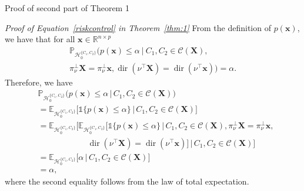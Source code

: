 \documentclass{beamer}
\newcommand{\projnu}{\pi_{\nu}^{\perp}}
\begin{document}
\begin{frame}[allowframebreaks=0.9]{Proof of second part of Theorem 1}

  \textit{Proof of Equation~\ref{riskcontrol} in Theorem~\ref{thm:1}}
    From the definition of $p(\mathbf{x})$, we have that for all $\mathbf{x} \in \mathbb{R}^{n \times p}$
    \begin{multline*}
      \mathbb{P}_{\mathcal{H}_0^{\{C_1,C_2\}}}\bigl(p(\mathbf{x}) \leq \alpha ~|~ C_1,C_2 \in \mathcal{C}(\mathbf{X}), \\
      \projnu \mathbf{X} = \projnu \mathbf{x}, \operatorname{dir}(\nu^\top \mathbf{X}) = \operatorname{dir}(\nu^\top \mathbf{x})\bigr) = \alpha.
    \end{multline*}
    Therefore, we have
    \begin{equation*}
      \begin{aligned}
        & \mathbb{P}_{\mathcal{H}_0^{\{C_1,C_2\}}}\big(p(\mathbf{x}) \le \alpha \,\big|\, C_1,C_2 \in \mathcal{C}(\mathbf{X})\big) \\
        &= \mathbb{E}_{\mathcal{H}_0^{\{C_1,C_2\}}}
            \Big[\mathds{1}\{p(\mathbf{x}) \le \alpha\} \,\big|\, C_1,C_2 \in \mathcal{C}(\mathbf{X})\Big] \\
        &= \mathbb{E}_{\mathcal{H}_0^{\{C_1,C_2\}}}
            \Big[\mathbb{E}_{\mathcal{H}_0^{\{C_1,C_2\}}}
            \Big[\mathds{1}\{p(\mathbf{x}) \le \alpha\} \,\Big|\,
            C_1,C_2 \in \mathcal{C}(\mathbf{X}),
            \projnu \mathbf{X} = \projnu \mathbf{x}, \\
        &\qquad\qquad\qquad
            \operatorname{dir}(\nu^\top \mathbf{X}) = \operatorname{dir}(\nu^\top \mathbf{x})
            \Big] \,\Big|\, C_1,C_2 \in \mathcal{C}(\mathbf{X})\Big] \\
        &= \mathbb{E}_{\mathcal{H}_0^{\{C_1,C_2\}}}
            \big[\alpha \,\big|\, C_1,C_2 \in \mathcal{C}(\mathbf{X})\big] \\
        &= \alpha,
      \end{aligned}
    \end{equation*}
    where the second equality follows from the law of total expectation.
\end{frame}
\end{document}
